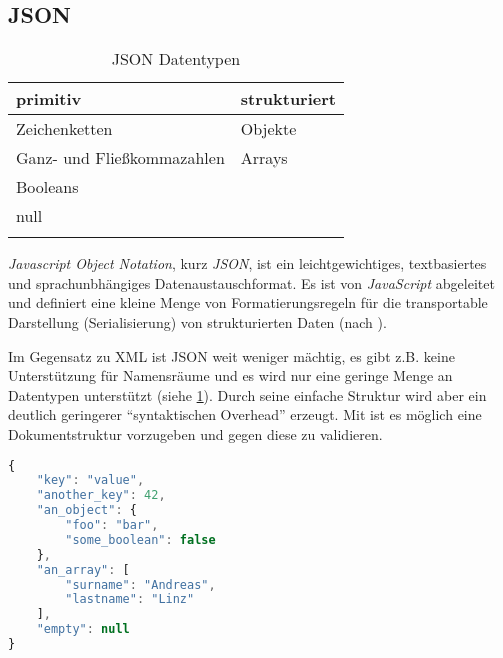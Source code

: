 \subsection{JSON}

\begin{longtable}[htb]{l l}
    \toprule
    \rowcolor{lightgray}
    \textbf{primitiv}   & \textbf{strukturiert}\\
    \midrule
    Zeichenketten       & Objekte\\
    Ganz- und 
    Fließkommazahlen    & Arrays\\
    Booleans            & \\
    null                & \\
    \bottomrule
    \caption{JSON Datentypen}
    \label{tab:jsonDatatypes}
\end{longtable}

\begin{thesisDefinition}[JSON]
\emph{Javascript Object Notation}, kurz \emph{JSON}, ist ein leichtgewichtiges, textbasiertes und sprachunbhängiges Datenaustauschformat. Es ist von \emph{JavaScript} abgeleitet und definiert eine kleine Menge von Formatierungsregeln für die transportable Darstellung (Serialisierung) von strukturierten Daten (nach \cite{JSONRFC}).
\end{thesisDefinition}

Im Gegensatz zu XML ist JSON weit weniger mächtig, es gibt z.B. keine Unterstützung für Namensräume und es wird nur eine geringe Menge an Datentypen unterstützt (siehe \cref{tab:jsonDatatypes}). 
Durch seine einfache Struktur wird aber ein deutlich geringerer \enquote{syntaktischen Overhead} erzeugt.
Mit  ist es möglich eine Dokumentstruktur vorzugeben und gegen diese zu validieren. 

%
%
\begin{minipage}{\textwidth}
    \begin{lstlisting}[language=JavaScript, caption=Minimalbeispiel für eine JSON-Datei]
{
    "key": "value",
    "another_key": 42,
    "an_object": {
        "foo": "bar",
        "some_boolean": false
    },
    "an_array": [
        "surname": "Andreas",
        "lastname": "Linz"
    ],
    "empty": null
}
    \end{lstlisting}
\end{minipage}